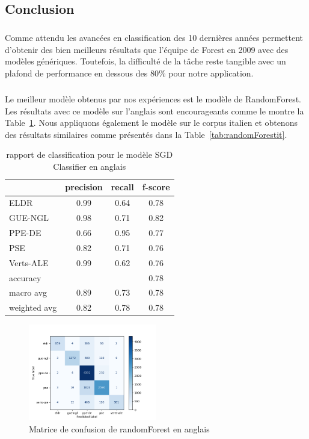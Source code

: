 \documentclass[11pt]{article}
\begin{document}
\subsection{Conclusion}
\subparagraph{}
Comme attendu les avancées en classification des 10 dernières années permettent d'obtenir des bien meilleurs résultats que l'équipe de Forest en 2009 avec des modèles génériques. Toutefois, la difficulté de la tâche reste tangible avec un plafond de performance en dessous des 80\% pour notre application.
\subparagraph{}
Le meilleur modèle obtenus par nos expériences est le modèle de RandomForest. Les résultats avec ce modèle sur l'anglais sont encourageants comme le montre la Table~\ref{tab:randomForesten}. Nous appliquons également le modèle sur le corpus italien et obtenons des résultats similaires comme présentés dans la Table~\ref{tab:randomForestit}.

\begin{table}[h]
\centering
\begin{tabular}{lccc}
\hline
 & precision & recall & f-score\\
\hline
ELDR & 0.99 & 0.64 &  0.78\\
GUE-NGL& 0.98 & 0.71 & 0.82\\
PPE-DE & 0.66& 0.95 & 0.77 \\ 
PSE &  0.82 & 0.71 & 0.76\\ 
Verts-ALE &  0.99& 0.62 &  0.76\\
\hline
accuracy& & &    0.78 \\
macro avg &  0.89 & 0.73 &  0.78 \\
weighted avg &  0.82 &0.78 &0.78 \\
\hline
\end{tabular}
\caption{rapport de classification pour le modèle SGD Classifier en anglais}
\label{tab:randomForesten}
\end{table}

\begin{figure}[h]
\includegraphics[width=0.5\textwidth]{matriceConfusionrandomforesten}
\caption{Matrice de confusion de randomForest en anglais}
\centering
\end{figure}
\end{document}
